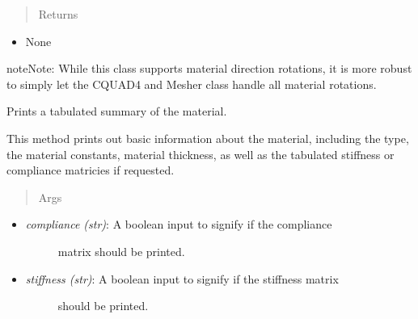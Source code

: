 \documentclass[letterpaper,10pt,english]{sphinxmanual}
\begin{document}
\begin{fulllineitems}
\begin{fulllineitems}
\begin{itemize}
\end{itemize}
\begin{quote}\begin{description}
\item[{Returns}] \leavevmode
\end{description}\end{quote}
\begin{itemize}
\item {} 
None

\end{itemize}

\begin{notice}{note}{Note:}
While this class supports material direction rotations, it is more
robust to simply let the CQUAD4 and Mesher class handle all material
rotations.
\end{notice}

\end{fulllineitems}


\begin{fulllineitems}
\label{structures:AeroComBAT.Structures.Material.printSummary}
Prints a tabulated summary of the material.

This method prints out basic information about the
material, including the type, the material constants, material
thickness, as well as the tabulated stiffness or compliance
matricies if requested.
\begin{quote}\begin{description}
\item[{Args}] \leavevmode
\end{description}\end{quote}
\begin{itemize}
\item {} \begin{description}
\item[{\emph{compliance (str)}: A boolean input to signify if the compliance}] \leavevmode
matrix should be printed.

\end{description}

\item {} \begin{description}
\item[{\emph{stiffness (str)}: A boolean input to signify if the stiffness matrix}] \leavevmode
should be printed.


\end{description}
\end{itemize}
\end{fulllineitems}
\end{fulllineitems}
\end{document}
